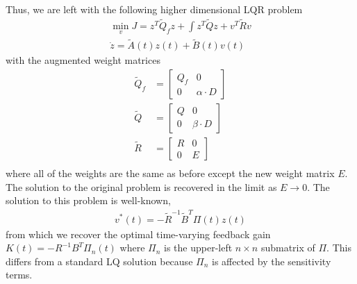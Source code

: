 \documentclass[10pt,a4paper]{article}
\begin{document}
Thus, we are left with the following higher dimensional LQR problem 
\begin{align}
\min_v J = z^T\tilde{Q}_fz + \int z^T\tilde{Q}z + v^T\tilde{R}v\\
	\dot{z} = \tilde{A}(t)z(t) + \tilde{B}(t)v(t)
\end{align}
with the augmented weight matrices
\begin{align}
\tilde{Q}_f &= \begin{bmatrix}
Q_f & 0\\
0 & \alpha\cdot D
\end{bmatrix} \\
\tilde{Q} &= \begin{bmatrix}
Q & 0\\
0 & \beta\cdot D
\end{bmatrix} \\	
\tilde{R} &= \begin{bmatrix}
R & 0\\
0 & E
\end{bmatrix} \\
\end{align}
where all of the weights are the same as before except the new weight matrix $E$. The solution to the original problem is recovered in the limit as $E\to 0$. The solution to this problem is well-known,
\begin{align}
v^*(t) = -\tilde{R}^{-1}\tilde{B}^T\Pi(t)z(t)
\end{align}
from which we recover the optimal time-varying feedback gain $K(t)=-R^{-1}B^T\Pi_n(t)$ where $\Pi_n$ is the upper-left $n\times n$ submatrix of $\Pi$. This differs from a standard LQ solution because $\Pi_n$ is affected by the sensitivity terms. 
\end{document}
